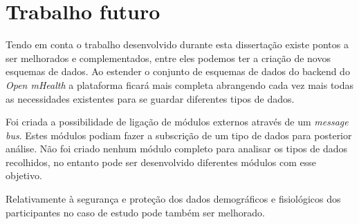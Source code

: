 \section{Trabalho futuro}
Tendo em conta o trabalho desenvolvido durante esta dissertação existe pontos a ser melhorados e complementados, entre eles podemos ter a criação de novos esquemas de dados. Ao estender o conjunto de esquemas de dados do backend do \textit{Open mHealth} a plataforma ficará mais completa abrangendo cada vez mais todas as necessidades existentes para se guardar diferentes tipos de dados.\par
Foi criada a possibilidade de ligação de módulos externos através de um \textit{message bus}. Estes módulos podiam fazer a subscrição de um tipo de dados para posterior análise. Não foi criado nenhum módulo completo para analisar os tipos de dados recolhidos, no entanto pode ser desenvolvido diferentes módulos com esse objetivo.\par
Relativamente à segurança e proteção dos dados demográficos e fisiológicos dos participantes no caso de estudo pode também ser melhorado.

\cleardoublepage
